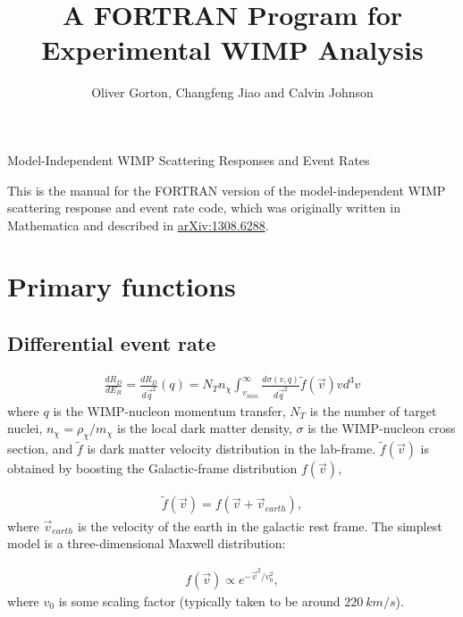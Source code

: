 \documentclass[11pt]{amsart}
\title{A FORTRAN Program for Experimental WIMP Analysis}
\author{Oliver Gorton, Changfeng Jiao and Calvin Johnson}
\begin{document}
\maketitle

{
\centering

Model-Independent WIMP Scattering Responses and Event Rates

}

\tableofcontents

This is the manual for the FORTRAN version of the model-independent WIMP scattering response and event rate code, which was originally written in Mathematica and described in \href{http://arxiv.org/abs/1308.6288v1}{arXiv:1308.6288}.

\section{Primary functions}
\subsection{Differential event rate}
\begin{equation}\label{ER}
\begin{split}
	\frac{dR_D}{dE_R} = \frac{dR_D}{d\vec{q}^2}(q)
	 = N_T n_\chi \int_{v_{min}}^\infty \frac{d\sigma(v,q)}{d\vec{q}^2} \tilde{f}(\vec{v})vd^3v
\end{split}
\end{equation}
where $q$ is the WIMP-nucleon momentum transfer, $N_T$ is the number of target nuclei, $n_\chi = \rho_\chi/m_\chi$ is the local dark matter density, $\sigma$ is the WIMP-nucleon cross section, and $\tilde{f}$ is dark matter velocity distribution in the lab-frame. $\tilde{f}(\vec{v})$ is obtained by boosting the Galactic-frame distribution $f(\vec{v})$, 

\begin{equation}\label{boost}
\begin{split}
	\tilde{f}(\vec{v}) = f(\vec{v} + \vec{v}_{earth}),
\end{split}
\end{equation}
where $\vec{v}_{earth}$ is the velocity of the earth in the galactic rest frame. The simplest model is a three-dimensional Maxwell distribution:

\begin{equation}
\begin{split}
	f(\vec{v}) \propto e^{-\vec{v}^2/v_0^2},
\end{split}
\end{equation}
where $v_0$ is some scaling factor (typically taken to be around $220\ km/s$).
\end{document}

